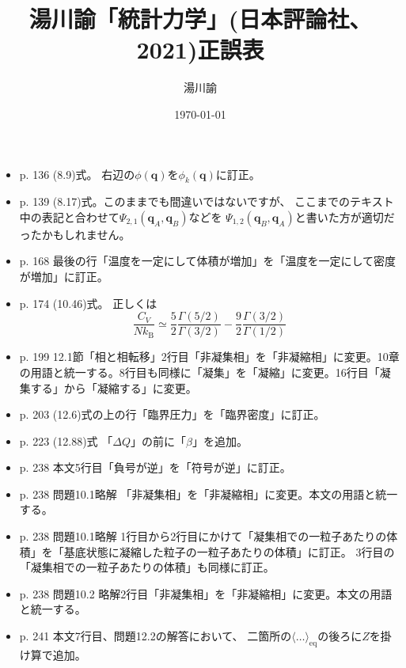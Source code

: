 \documentclass[dvipdfmx,uplatex]{jsarticle}
\begin{document}
\title{湯川諭「統計力学」(日本評論社、2021)正誤表}
\author{湯川諭}
\date{\today}
\maketitle
\begin{itemize}
\item
p. 136 (8.9)式。
右辺の$\phi(\boldsymbol{q})$を$\phi_{k}(\boldsymbol{q})$に訂正。
\item
p. 139 (8.17)式。このままでも間違いではないですが、
ここまでのテキスト中の表記と合わせて$\Psi_{2,1}(\boldsymbol{q}_{A}, \boldsymbol{q}_{B})$などを
$\Psi_{1,2}(\boldsymbol{q}_{B}, \boldsymbol{q}_{A})$と書いた方が適切だったかもしれません。
\item
p. 168 最後の行「温度を一定にして体積が増加」を「温度を一定にして密度が増加」に訂正。
\item
p. 174 (10.46)式。
正しくは
\[
 \dfrac{C_V}{N k_\mathrm{B}}\simeq
 \dfrac{5}{2} \dfrac{\Gamma(5/2)}{\Gamma(3/2)} -
 \dfrac{9}{2} \dfrac{\Gamma(3/2)}{\Gamma(1/2)}
\]
\item
p. 199 12.1節「相と相転移」2行目「非凝集相」を「非凝縮相」に変更。10章の用語と統一する。8行目も同様に「凝集」を「凝縮」に変更。16行目「凝集する」から「凝縮する」に変更。
\item
p. 203 (12.6)式の上の行「臨界圧力」を「臨界密度」に訂正。
\item
p. 223 (12.88)式 「$\Delta Q$」の前に「$\beta$」を追加。
\item
p. 238 本文5行目「負号が逆」を「符号が逆」に訂正。
\item 
p. 238 問題10.1略解 「非凝集相」を「非凝縮相」に変更。本文の用語と統一する。
\item
p. 238 問題10.1略解 1行目から2行目にかけて「凝集相での一粒子あたりの体積」を「基底状態に凝縮した粒子の一粒子あたりの体積」に訂正。
3行目の「凝集相での一粒子あたりの体積」も同様に訂正。
\item
p. 238 問題10.2 略解2行目「非凝集相」を「非凝縮相」に変更。本文の用語と統一する。
\item
p. 241 本文7行目、問題12.2の解答において、 二箇所の$\langle \dots \rangle_{\mathrm{eq}}$の後ろに$Z$を掛け算で追加。
\end{itemize}
\end{document}
